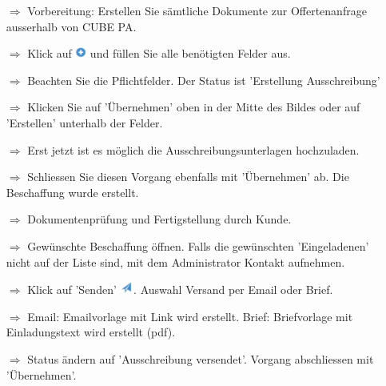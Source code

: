 \documentclass{article}
\begin{document}
\begin{multicols}{2}

\begin{tcolorbox}[colback=blue!5,colframe=blue!40!black,title=(1) Neue Beschaffung initialisieren]
\begin{itemize}
  \item[$\Longrightarrow$] Vorbereitung: Erstellen Sie sämtliche Dokumente zur Offertenanfrage ausserhalb von CUBE PA.
  \item[$\Longrightarrow$] Klick auf \includegraphics[height=10pt]{Icons/Plussymbol.jpg} und füllen Sie alle benötigten Felder aus.
  \item[$\Longrightarrow$] Beachten Sie die Pflichtfelder. Der Status ist 'Erstellung Ausschreibung'
  \item[$\Longrightarrow$] Klicken Sie auf 'Übernehmen' oben in der Mitte des Bildes oder auf 'Erstellen' unterhalb der Felder.
	\item[$\Longrightarrow$] Erst jetzt ist es möglich die Ausschreibungsunterlagen hochzuladen.
  \item[$\Longrightarrow$] Schliessen Sie diesen Vorgang ebenfalls mit 'Übernehmen' ab. Die Beschaffung wurde erstellt.
	\item[$\Longrightarrow$] Dokumentenprüfung und Fertigstellung durch Kunde.
\end{itemize}
\end{tcolorbox}




\begin{tcolorbox}[colback=blue!5,colframe=blue!40!black,title=(2) Offertanfrage versenden]
\begin{itemize}
  \item[$\Longrightarrow$] Gewünschte Beschaffung öffnen. Falls die gewünschten 'Eingeladenen' nicht auf der Liste sind, mit dem Administrator Kontakt aufnehmen.
	\item[$\Longrightarrow$] Klick auf 'Senden' \includegraphics[height=12pt]{Icons/Versandsymbol.jpg}. Auswahl Versand per Email oder Brief.
  \item[$\Longrightarrow$] Email: Emailvorlage mit Link wird erstellt. Brief: Briefvorlage mit Einladungstext wird erstellt (pdf).
  \item[$\Longrightarrow$] Status ändern auf 'Ausschreibung versendet'. Vorgang abschliessen mit 'Übernehmen'.
\end{itemize}
\end{tcolorbox}


\end{multicols}
\end{document}
